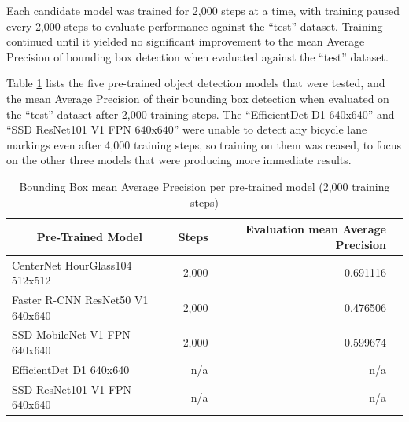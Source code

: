 \documentclass[11pt,twoside]{report}
\begin{document}
Each candidate model was trained for 2,000 steps at a time, with training paused every 2,000 steps to evaluate performance against the ``test'' dataset.  Training continued until it yielded no significant improvement to the mean Average Precision of bounding box detection when evaluated against the ``test'' dataset.  

Table \ref{table1} lists the five pre-trained object detection models that were tested, and the mean Average Precision of their bounding box detection when evaluated on the ``test'' dataset after 2,000 training steps.  The ``EfficientDet D1 640x640'' and ``SSD ResNet101 V1 FPN 640x640'' were unable to detect any bicycle lane markings even after 4,000 training steps, so training on them was ceased, to focus on the other three models that were producing more immediate results.

\begin{table}[h]
\centering
\begin{tabular}{|l|r|r|r|}
\hline
\multicolumn{1}{|c|}{\bfseries Pre-Trained Model} & \textbf{Steps} & \textbf{Evaluation mean Average Precision} \\
\hline
CenterNet HourGlass104 512x512 & 2,000 & 0.691116 \\
Faster R-CNN ResNet50 V1 640x640 & 2,000 & 0.476506 \\
SSD MobileNet V1 FPN 640x640 & 2,000 & 0.599674 \\
EfficientDet D1 640x640 & n/a & n/a \\
SSD ResNet101 V1 FPN 640x640 & n/a & n/a \\
\hline
\end{tabular}
\caption{Bounding Box mean Average Precision per pre-trained model (2,000 training steps)}
\label{table1}
\end{table}
\end{document}
